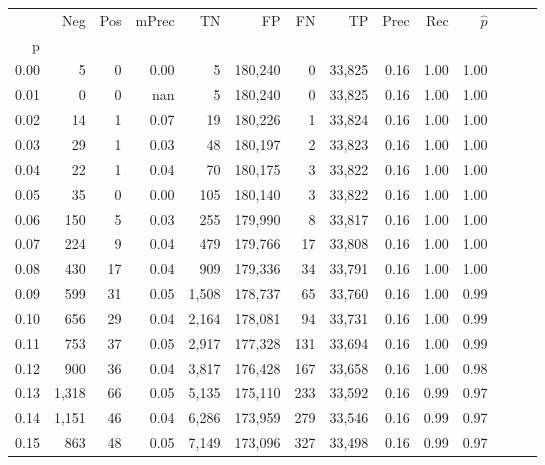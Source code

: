 \begin{tabular}{rrrrrrrrrrrrrr}
\toprule
{} &    Neg &  Pos & mPrec &       TN &       FP &      FN &      TP &  Prec &   Rec & $\hat{p}$ \\
p    &        &      &       &          &          &         &         &       &       &           \\
\midrule
0.00 &      5 &    0 &  0.00 &        5 &  180,240 &       0 &  33,825 &  0.16 &  1.00 &      1.00 \\
0.01 &      0 &    0 &   nan &        5 &  180,240 &       0 &  33,825 &  0.16 &  1.00 &      1.00 \\
0.02 &     14 &    1 &  0.07 &       19 &  180,226 &       1 &  33,824 &  0.16 &  1.00 &      1.00 \\
0.03 &     29 &    1 &  0.03 &       48 &  180,197 &       2 &  33,823 &  0.16 &  1.00 &      1.00 \\
0.04 &     22 &    1 &  0.04 &       70 &  180,175 &       3 &  33,822 &  0.16 &  1.00 &      1.00 \\
0.05 &     35 &    0 &  0.00 &      105 &  180,140 &       3 &  33,822 &  0.16 &  1.00 &      1.00 \\
0.06 &    150 &    5 &  0.03 &      255 &  179,990 &       8 &  33,817 &  0.16 &  1.00 &      1.00 \\
0.07 &    224 &    9 &  0.04 &      479 &  179,766 &      17 &  33,808 &  0.16 &  1.00 &      1.00 \\
0.08 &    430 &   17 &  0.04 &      909 &  179,336 &      34 &  33,791 &  0.16 &  1.00 &      1.00 \\
0.09 &    599 &   31 &  0.05 &    1,508 &  178,737 &      65 &  33,760 &  0.16 &  1.00 &      0.99 \\
0.10 &    656 &   29 &  0.04 &    2,164 &  178,081 &      94 &  33,731 &  0.16 &  1.00 &      0.99 \\
0.11 &    753 &   37 &  0.05 &    2,917 &  177,328 &     131 &  33,694 &  0.16 &  1.00 &      0.99 \\
0.12 &    900 &   36 &  0.04 &    3,817 &  176,428 &     167 &  33,658 &  0.16 &  1.00 &      0.98 \\
0.13 &  1,318 &   66 &  0.05 &    5,135 &  175,110 &     233 &  33,592 &  0.16 &  0.99 &      0.97 \\
0.14 &  1,151 &   46 &  0.04 &    6,286 &  173,959 &     279 &  33,546 &  0.16 &  0.99 &      0.97 \\
0.15 &    863 &   48 &  0.05 &    7,149 &  173,096 &     327 &  33,498 &  0.16 &  0.99 &      0.97 \\

\end{tabular}
